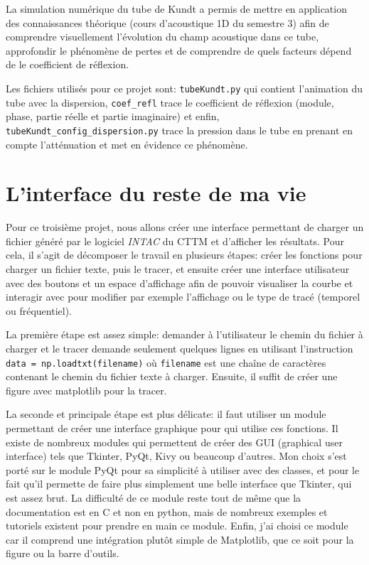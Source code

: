 \documentclass[a4paper, 11pt]{article}
\begin{document}
La simulation numérique du tube de Kundt a permis de mettre en application des connaissances théorique (cours d'acoustique 1D du semestre 3) afin de comprendre visuellement l'évolution du champ acoustique dans ce tube, approfondir le phénomène de pertes et de comprendre de quels facteurs dépend de le coefficient de réflexion.

 Les fichiers utilisés pour ce projet sont: \verb|tubeKundt.py| qui contient l'animation du tube avec la dispersion, \verb|coef_refl| trace le coefficient de réflexion (module, phase, partie réelle et partie imaginaire) et enfin, \verb|tubeKundt_config_dispersion.py| trace la pression dans le tube en prenant en compte l'atténuation et met en évidence ce phénomène.
 
 
 
 


\newpage
\section{L'interface du reste de ma vie}

Pour ce troisième projet, nous allons créer une interface permettant de charger un fichier généré par le logiciel \textit{INTAC} du CTTM et d'afficher les résultats. Pour cela, il s'agit de décomposer le travail en plusieurs étapes: créer les fonctions pour charger un fichier texte, puis le tracer, et ensuite créer une interface utilisateur avec des boutons et un espace d'affichage afin de pouvoir visualiser la courbe et interagir avec pour modifier par exemple l'affichage ou le type de tracé (temporel ou fréquentiel). 

La première étape est assez simple: demander à l'utilisateur le chemin du fichier à charger et le tracer demande seulement quelques lignes en utilisant l'instruction \verb|data = np.loadtxt(filename)| où \verb|filename| est une chaîne de caractères contenant le chemin du fichier texte à charger. Ensuite, il suffit de créer une figure avec matplotlib pour la tracer.

La seconde et principale étape est plus délicate: il faut utiliser un module permettant de créer une interface graphique pour qui utilise ces fonctions. Il existe de nombreux modules qui permettent de créer des GUI (graphical user interface) tels que Tkinter, PyQt, Kivy ou beaucoup d'autres. Mon choix s'est porté sur le module PyQt pour sa simplicité à utiliser avec des classes, et pour le fait qu'il permette de faire plus simplement une belle interface que Tkinter, qui est assez brut. La difficulté de ce module reste tout de même que la documentation est en C et non en python, mais de nombreux exemples et tutoriels existent pour prendre en main ce module. Enfin, j'ai choisi ce module car il comprend une intégration plutôt simple de Matplotlib, que ce soit pour la figure ou la barre d'outils.
\end{document}
